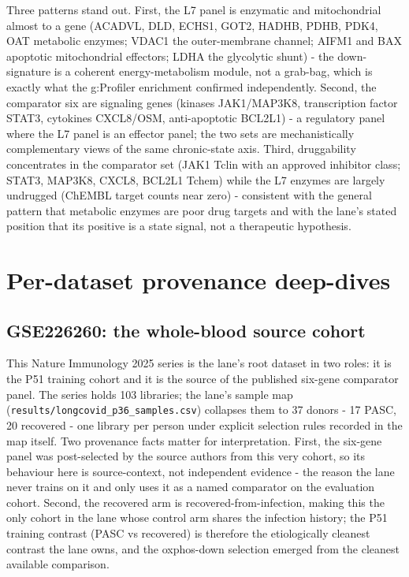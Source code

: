 \documentclass[11pt,a4paper]{article}
\begin{document}
Three patterns stand out. First, the L7 panel is enzymatic and mitochondrial
almost to a gene (ACADVL, DLD, ECHS1, GOT2, HADHB, PDHB, PDK4, OAT metabolic
enzymes; VDAC1 the outer-membrane channel; AIFM1 and BAX apoptotic
mitochondrial effectors; LDHA the glycolytic shunt) - the down-signature is a
coherent energy-metabolism module, not a grab-bag, which is exactly what the
g:Profiler enrichment confirmed independently. Second, the comparator six are
signaling genes (kinases JAK1/MAP3K8, transcription factor STAT3, cytokines
CXCL8/OSM, anti-apoptotic BCL2L1) - a regulatory panel where the L7 panel is
an effector panel; the two sets are mechanistically complementary views of
the same chronic-state axis. Third, druggability concentrates in the
comparator set (JAK1 Tclin with an approved inhibitor class; STAT3, MAP3K8,
CXCL8, BCL2L1 Tchem) while the L7 enzymes are largely undrugged (ChEMBL
target counts near zero) - consistent with the general pattern that metabolic
enzymes are poor drug targets and with the lane's stated position that its
positive is a state signal, not a therapeutic hypothesis.


\section{Per-dataset provenance deep-dives}
\subsection{GSE226260: the whole-blood source cohort}
This Nature Immunology 2025 series is the lane's root dataset in two roles:
it is the P51 training cohort and it is the source of the published six-gene
comparator panel. The series holds 103 libraries; the lane's sample map
(\texttt{results/longcovid\_p36\_samples.csv}) collapses them to 37 donors -
17 PASC, 20 recovered - one library per person under explicit selection rules
recorded in the map itself. Two provenance facts matter for interpretation.
First, the six-gene panel was post-selected by the source authors from this
very cohort, so its behaviour here is source-context, not independent
evidence - the reason the lane never trains on it and only uses it as a named
comparator on the evaluation cohort. Second, the recovered arm is
recovered-from-infection, making this the only cohort in the lane whose
control arm shares the infection history; the P51 training contrast
(PASC vs recovered) is therefore the etiologically cleanest contrast the lane
owns, and the oxphos-down selection emerged from the cleanest available
comparison.
\end{document}
